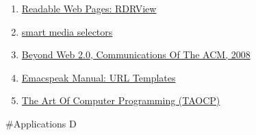 \documentclass[11pt]{article}
\begin{document}
\begin{enumerate}
\item \href{https://github.com/eafer/rdrview}{Readable Web Pages: RDRView}
\item \href{https://emacspeak.blogspot.com/2024/03/updated-smart-media-selector-for-audio.html}{smart media selectors}
\item \href{https://research.google/blog/beyond-web-20/?hl=in\&m=1}{Beyond Web 2.0, Communications
Of The ACM, 2008}
\item \href{https://tvraman.github.io/emacspeak/manual/URL-Templates.html}{Emacspeak Manual: URL Templates}
\item \href{https://www-cs-faculty.stanford.edu/\~knuth/taocp.html}{The Art Of Computer Programming (TAOCP)}
\end{enumerate}


\#Applications
D
\end{document}
